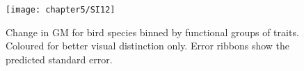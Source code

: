 \begin{figure}[htb]
\centering
\texttt{[image: chapter5/SI12]}
\caption{Change in GM for bird species binned by functional groups of traits. Coloured for better visual distinction only. Error ribbons show the predicted standard error.}
\label{SI05_12}
\end{figure}
